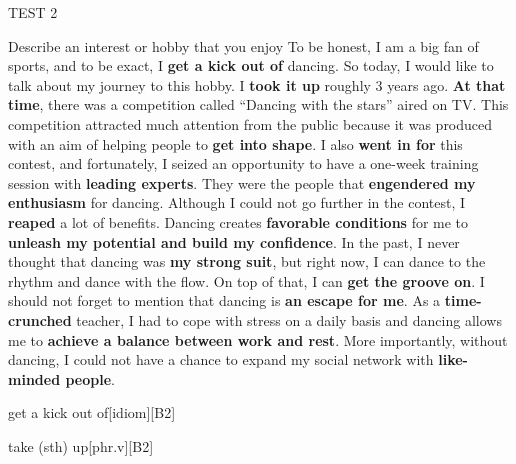 \begin{glossarymc}[Cambridge 4]
\begin{test}{TEST 2}
\begin{qa}{Describe an interest or hobby that you enjoy}
	To be honest, I am a big fan of sports, and to be exact, I \textbf{get a kick out of} dancing. So today, I would like to talk about my journey to this hobby. I \textbf{took it up} roughly 3 years ago. \textbf{At that time}, there was a competition called ``Dancing with the stars'' aired on TV. This competition attracted much attention from the public because it was produced with an aim of helping people to \textbf{get into shape}. I also \textbf{went in for} this contest, and fortunately, I seized an opportunity to have a one-week training session with \textbf{leading experts}. They were the people that \textbf{engendered my enthusiasm} for dancing. Although I could not go further in the contest, I \textbf{reaped} a lot of benefits. Dancing creates \textbf{favorable conditions} for me to \textbf{unleash my potential and build my confidence}. In the past, I never thought that dancing was \textbf{my strong suit}, but right now, I can dance to the rhythm and dance with the flow. On top of that, I can \textbf{get the groove on}. I should not forget to mention that dancing is \textbf{an escape for me}. As a \textbf{time-crunched} teacher, I had to cope with stress on a daily basis and dancing allows me to \textbf{achieve a balance between work and rest}. More importantly, without dancing, I could not have a chance to expand my social network with \textbf{like-minded people}.
	\end{qa}

        \begin{VocabExplain}[Part 2]
			\begin{ExplainCard}{get a kick out of}[idiom][B2]
			\end{ExplainCard}

			\begin{ExplainCard}{take (sth) up}[phr.v][B2]
			\end{ExplainCard}


\end{VocabExplain}
\end{test}
\end{glossarymc}
